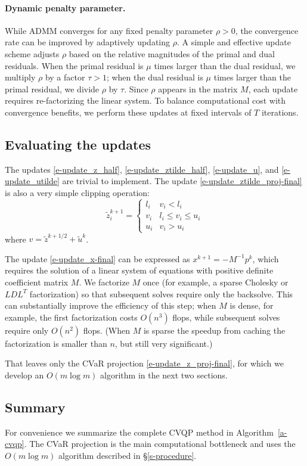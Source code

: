 \documentclass[12pt]{article}
\begin{document}
\paragraph{Dynamic penalty parameter.} 
While ADMM converges for any fixed penalty parameter $\rho > 0$, the convergence
rate can be improved by adaptively updating $\rho$. A simple and effective
update scheme adjusts $\rho$ based on the relative magnitudes of the primal and
dual residuals. When the primal residual is $\mu$ times larger than the dual
residual, we multiply $\rho$ by a factor $\tau > 1$; when the dual residual is
$\mu$ times larger than the primal residual, we divide $\rho$ by $\tau$. Since
$\rho$ appears in the matrix $M$, each update requires re-factorizing the linear
system. To balance computational cost with convergence benefits, we perform
these updates at fixed intervals of $T$ iterations.


\subsection{Evaluating the updates}
The updates
\eqref{e-update_z_half}, \eqref{e-update_ztilde_half}, \eqref{e-update_u}, and
\eqref{e-update_utilde} are trivial to implement.
The update \eqref{e-update_ztilde_proj-final} is also a very simple clipping
operation:
\[
\tilde z^{k+1}_i = \begin{cases} 
l_i & v_i < l_i \\ 
v_i & l_i \leq v_i \leq u_i \\ 
u_i & v_i > u_i 
\end{cases}
\]
where $v = \tilde z^{k+1/2}+\tilde u^k$.

The update \eqref{e-update_x-final} can be expressed as $x^{k+1} = -M^{-1}p^k$,
which requires the solution of a linear system of equations with positive definite 
coefficient matrix $M$.
We factorize $M$ once
(for example, a sparse Cholesky or $LDL^T$ factorization) so that subsequent solves
require only the backsolve.
This can substantially improve the efficiency of this step; when $M$ is dense,
for example, the first factorization costs $O(n^3)$ flops, while subsequent solves
require only $O(n^2)$ flops.  (When $M$ is sparse the speedup from caching 
the factorization is smaller than $n$, but still very significant.)

That leaves only the CVaR projection \eqref{e-update_z_proj-final}, for
which we develop an $O(m\log m)$ algorithm in the next two sections.

\subsection{Summary}
For convenience we summarize the complete CVQP method in
Algorithm~\ref{a-cvqp}. The CVaR projection is the main computational
bottleneck and uses the $O(m\log m)$ algorithm described in
\S\ref{s-procedure}.
\end{document}
